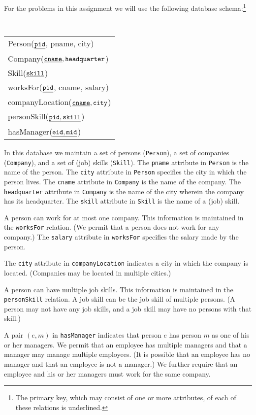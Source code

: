 \documentclass{article}
\begin{document}
For the problems in this assignment we will use the following database schema:\footnote{The primary key, which may consist of one or more attributes, of each of these relations is underlined.}

\begin{center}
{\tt
  \begin{tabular}{l}
  {Person}($\underline{\tt pid}$, pname, city) \\
  {Company}($\underline{\tt cname}, {\tt headquarter}$) \\
  {Skill}($\underline{\tt skill}$) \\
  {worksFor}($\underline{\tt pid}$, cname, salary) \\
  {companyLocation}($\underline{\tt cname}, {\tt city}$) \\
  {personSkill}($\underline{\tt pid, skill}$) \\
  {hasManager}($\underline{\tt eid, mid}$) \\
  \end{tabular}
  }
\end{center}

In this database we maintain a set of persons ({\tt Person}), a set
of companies ({\tt Company}), and a set of (job) skills ({\tt Skill}).  
The {\tt pname} attribute in {\tt Person} is the name of the person.  
The {\tt city} attribute in {\tt Person} specifies the city in which the person lives.  
The {\tt cname} attribute in {\tt Company} is the name of the company.
The {\tt headquarter} attribute in {\tt Company} is the name of the city wherein the company has its headquarter.
The {\tt skill} attribute in {\tt Skill} is the name of a (job) skill.

A person can work for at most one company. This information is maintained in the {\tt worksFor} relation. (We permit that a person does not work for any company.)
The {\tt salary} attribute in {\tt worksFor} specifies the salary made by the person.

The {\tt city} attribute in {\tt companyLocation} indicates a city in which the company is located.
(Companies may be located in multiple cities.)

A person can have multiple job skills. This information is maintained in the {\tt personSkill} relation.  A job skill can be
the job skill of multiple persons.  (A person may not have any job skills, and a job skill may
have no persons with that skill.)

A pair $(e,m)$ in {\tt hasManager} indicates that person $e$ has  
person $m$ as one of his or her managers.
We permit that an employee has multiple managers and that a manager  may manage
multiple employees.  (It is possible that an employee has no manager
and that an employee is not a manager.)
We further require that 
an employee and his or her managers must work for the
same company.
\end{document}
